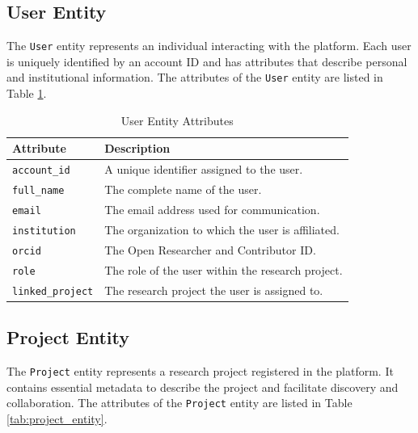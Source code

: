\documentclass[final]{rc-book-2.14}
\begin{document}
\subsection{User Entity}
The \texttt{User} entity represents an individual interacting with the platform. Each user is uniquely identified by an account ID and has attributes that describe personal and institutional information. The attributes of the \texttt{User} entity are listed in Table \ref{tab:user_entity}.

\begin{table}[h]
    \centering
    \renewcommand{\arraystretch}{1.2}
    \caption{User Entity Attributes}
    \label{tab:user_entity}
    \begin{tabularx}{\textwidth}{|l|X|}
        \hline
        \textbf{Attribute}       & \textbf{Description}                              \\ \hline
        \texttt{account\_id}     & A unique identifier assigned to the user.         \\ \hline
        \texttt{full\_name}      & The complete name of the user.                    \\ \hline
        \texttt{email}           & The email address used for communication.         \\ \hline
        \texttt{institution}     & The organization to which the user is affiliated. \\ \hline
        \texttt{orcid}           & The Open Researcher and Contributor ID.           \\ \hline
        \texttt{role}            & The role of the user within the research project. \\ \hline
        \texttt{linked\_project} & The research project the user is assigned to.     \\ \hline
    \end{tabularx}
\end{table}


\subsection{Project Entity}
The \texttt{Project} entity represents a research project registered in the platform. It contains essential metadata to describe the project and facilitate discovery and collaboration. The attributes of the \texttt{Project} entity are listed in Table \ref{tab:project_entity}.
\end{document}
